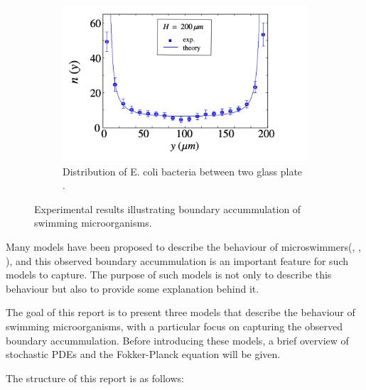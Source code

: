 \begin{figure}[htbp]
\begin{subfigure}[b]{0.45\textwidth}
      \includegraphics[width=\textwidth]{graphics/e_coli_distribution.png}
      \caption{Distribution of E. coli bacteria between two glass plate \cite{berke2008hydrodynamic}.}
      \label{fig:image2}
    \end{subfigure}
    \caption{Experimental results illustrating boundary accummulation of swimming microorganisms.}
    \label{fig:both_images}
  \end{figure}

Many models have been proposed to describe the behaviour of microswimmers(\cite{chen2021shape},
\cite{berke2008hydrodynamic}, \cite{ai2013rectification}), and this observed boundary accummulation is
an important feature for such models to capture. The purpose of such models is not only to describe this behaviour
but also to provide some explanation behind it.


The goal of this report is to present three models that describe the behaviour of swimming microorganisms,
with a particular focus on capturing the observed boundary accummulation. Before introducing these models, 
a brief overview of stochastic PDEs and the Fokker-Planck equation will be given.

The structure of this report is as follows:

